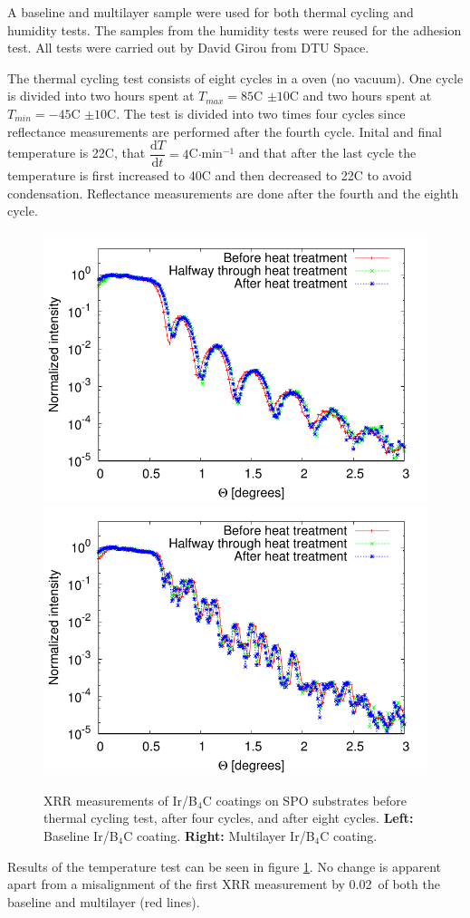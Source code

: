 A baseline and multilayer sample were used for both thermal cycling and humidity tests. The samples from the humidity tests were reused for the adhesion test. All tests were carried out by David Girou from DTU Space.

The thermal cycling test consists of eight cycles in a oven (no vacuum). One cycle is divided into two hours spent at $T_{max}=85$\degr C $\pm 10$\degr C and two hours spent at $T_{min}=-45$\degr C $\pm 10$\degr C. The test is divided into two times four cycles since reflectance measurements are performed after the fourth cycle. Inital and final temperature is 22\degr C, that $\dfrac{\text{d}T}{\text{d}t}=4$\degr C$\cdot$min$^{-1}$ and that after the last cycle the temperature is first increased to 40\degr C and then decreased to 22\degr C to avoid condensation. Reflectance measurements are done after the fourth and the eighth cycle.

\begin{figure}[!h]
  \center
  \includegraphics[width=0.47\linewidth]{figures/athena/coating_on_spo/123-10-12_cooked_2.pdf}
  \includegraphics[width=0.47\linewidth]{figures/athena/coating_on_spo/120-10-21_cooked_2.pdf}
\caption{\footnotesize XRR measurements of Ir/B$_4$C coatings on SPO substrates before thermal cycling test, after four cycles, and after eight cycles. \textbf{Left:} Baseline Ir/B$_4$C coating. \textbf{Right:} Multilayer Ir/B$_4$C coating.}\label{fig:qa_temp}
\end{figure}

Results of the temperature test can be seen in figure \ref{fig:qa_temp}. No change is apparent apart from a misalignment of the first XRR measurement by 0.02\degr\ of both the baseline and multilayer (red lines).

